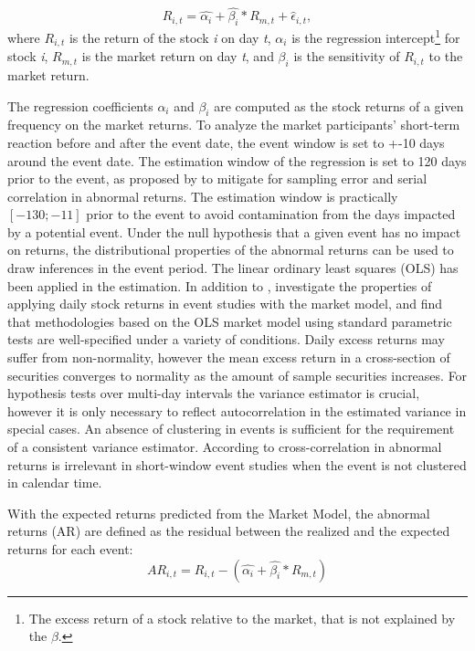 \begin{equation} \label{market_model}
    R_{i,t} = \hat{\alpha_i} + \hat{\beta_i} * R_{m,t} + \hat{\epsilon}_{i,t},
\end{equation}
 where $R_{i,t}$ is the return of the stock \textit{i} on day \textit{t}, $\alpha_i$ is the regression intercept\footnote{The excess return of a stock relative to the market, that is not explained by the $\beta$.} for stock \textit{i}, $R_{m,t}$ is the market return on day \textit{t}, and
 $\beta_i$ is the sensitivity of $R_{i,t}$ to the market return.  

 The regression coefficients $\alpha_i$ and $\beta_i$ are computed as the stock returns of a given frequency on the market returns. To analyze the market participants' short-term reaction before and after the event date, the event window is set to +-10 days around the event date. The estimation window of the regression is set to 120 days prior to the event, as proposed by \cite{Event_studies} to mitigate for sampling error and serial correlation in abnormal returns. The estimation window is practically $[-130;-11]$ prior to the event to avoid contamination from the days impacted by a potential event. Under the null hypothesis that a given event has no impact on returns, the distributional properties of the abnormal returns can be used to draw inferences in the event period. 
 The linear ordinary least squares (OLS) has been applied in the estimation. In addition to \cite{Event_studies},\cite{brown1985using} investigate the properties of applying daily stock returns in event studies with the market model, and find that methodologies based on the OLS market model using standard parametric tests are well-specified under a variety of conditions. Daily excess returns may suffer from non-normality, however the mean excess return in a cross-section of securities converges to normality as the amount of sample securities increases. For hypothesis tests over multi-day intervals the variance estimator is crucial, however it is only necessary to reflect autocorrelation in the estimated variance in special cases. An absence of clustering in events is sufficient for the requirement of a consistent variance estimator. According to \cite{kothari} cross-correlation in abnormal returns is irrelevant in short-window event studies when the event is not clustered in calendar time.

 With the expected returns predicted from the Market Model, the abnormal returns (AR) are defined as the residual between the realized and the expected returns for each event:
 \begin{equation}
    AR_{i,t} = R_{i,t} - (\hat{\alpha_i} + \hat{\beta_i} * R_{m,t})
 \end{equation}

